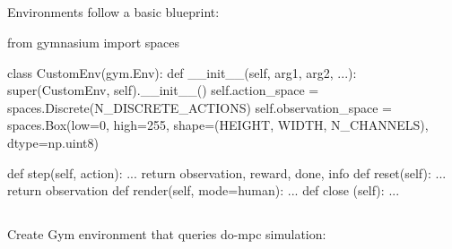 \documentclass[
  letterpaper,
  DIV=11,
  numbers=noendperiod,
  oneside]{scrartcl}
\newenvironment{Shaded}{\begin{snugshade}}{\end{snugshade}}
\newcommand{\BuiltInTok}[1]{\textcolor[rgb]{0.00,0.23,0.31}{#1}}
\newcommand{\ControlFlowTok}[1]{\textcolor[rgb]{0.00,0.23,0.31}{#1}}
\newcommand{\DecValTok}[1]{\textcolor[rgb]{0.68,0.00,0.00}{#1}}
\newcommand{\FunctionTok}[1]{\textcolor[rgb]{0.28,0.35,0.67}{#1}}
\newcommand{\ImportTok}[1]{\textcolor[rgb]{0.00,0.46,0.62}{#1}}
\newcommand{\KeywordTok}[1]{\textcolor[rgb]{0.00,0.23,0.31}{#1}}
\newcommand{\NormalTok}[1]{\textcolor[rgb]{0.00,0.23,0.31}{#1}}
\newcommand{\OperatorTok}[1]{\textcolor[rgb]{0.37,0.37,0.37}{#1}}
\newcommand{\StringTok}[1]{\textcolor[rgb]{0.13,0.47,0.30}{#1}}
\newcommand{\VariableTok}[1]{\textcolor[rgb]{0.07,0.07,0.07}{#1}}
\begin{document}
\subsection{}\label{section-39}

Environments follow a basic blueprint:

\begin{Shaded}
\begin{Highlighting}[numbers=left,,]
\ImportTok{from}\NormalTok{ gymnasium }\ImportTok{import}\NormalTok{ spaces}

\KeywordTok{class}\NormalTok{ CustomEnv(gym.Env):}
  \KeywordTok{def} \FunctionTok{\_\_init\_\_}\NormalTok{(}\VariableTok{self}\NormalTok{, arg1, arg2, ...):}
    \BuiltInTok{super}\NormalTok{(CustomEnv, }\VariableTok{self}\NormalTok{).}\FunctionTok{\_\_init\_\_}\NormalTok{()}
    \VariableTok{self}\NormalTok{.action\_space }\OperatorTok{=}\NormalTok{ spaces.Discrete(N\_DISCRETE\_ACTIONS)}
    \VariableTok{self}\NormalTok{.observation\_space }\OperatorTok{=}\NormalTok{ spaces.Box(low}\OperatorTok{=}\DecValTok{0}\NormalTok{, high}\OperatorTok{=}\DecValTok{255}\NormalTok{, shape}\OperatorTok{=}\NormalTok{(HEIGHT, WIDTH, N\_CHANNELS), dtype}\OperatorTok{=}\NormalTok{np.uint8)}

  \KeywordTok{def}\NormalTok{ step(}\VariableTok{self}\NormalTok{, action):}
\NormalTok{    ...}
    \ControlFlowTok{return}\NormalTok{ observation, reward, done, info}
  \KeywordTok{def}\NormalTok{ reset(}\VariableTok{self}\NormalTok{):}
\NormalTok{    ...}
    \ControlFlowTok{return}\NormalTok{ observation}
  \KeywordTok{def}\NormalTok{ render(}\VariableTok{self}\NormalTok{, mode}\OperatorTok{=}\StringTok{\textquotesingle{}human\textquotesingle{}}\NormalTok{):}
\NormalTok{    ...}
  \KeywordTok{def}\NormalTok{ close (}\VariableTok{self}\NormalTok{):}
\NormalTok{    ...}
\end{Highlighting}
\end{Shaded}

\subsection{}\label{section-40}

Create Gym environment that queries do-mpc simulation:
\end{document}
